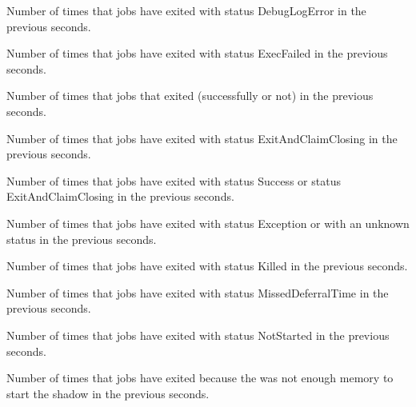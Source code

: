 \begin{description}
\item[\AdAttr{JobsDebugLogError}:] Number of times that jobs have exited with status DebugLogError
  in the previous  seconds.

\item[\AdAttr{JobsExecFailed}:] Number of times that jobs have exited with status ExecFailed
  in the previous  seconds.

\item[\AdAttr{JobsExited}:] Number of times that jobs that exited (successfully or not)
  in the previous  seconds.

\item[\AdAttr{JobsExitedAndClaimClosing}:] Number of times that jobs have exited with status ExitAndClaimClosing
  in the previous  seconds.

\item[\AdAttr{JobsExitedNormally}:] Number of times that jobs have exited with status Success or status ExitAndClaimClosing
  in the previous  seconds.

\item[\AdAttr{JobsExitException}:] Number of times that jobs have exited with status Exception or with an unknown status
  in the previous  seconds.

\item[\AdAttr{JobsKilled}:] Number of times that jobs have exited with status Killed
  in the previous  seconds.

\item[\AdAttr{JobsMissedDeferralTime}:] Number of times that jobs have exited with status MissedDeferralTime
  in the previous  seconds.

\item[\AdAttr{JobsNotStarted}:] Number of times that jobs have exited with status NotStarted
  in the previous  seconds.

\item[\AdAttr{JobsShadowNoMemory}:] Number of times that jobs have exited because the was not enough memory to start the shadow
  in the previous  seconds.


\end{description}

